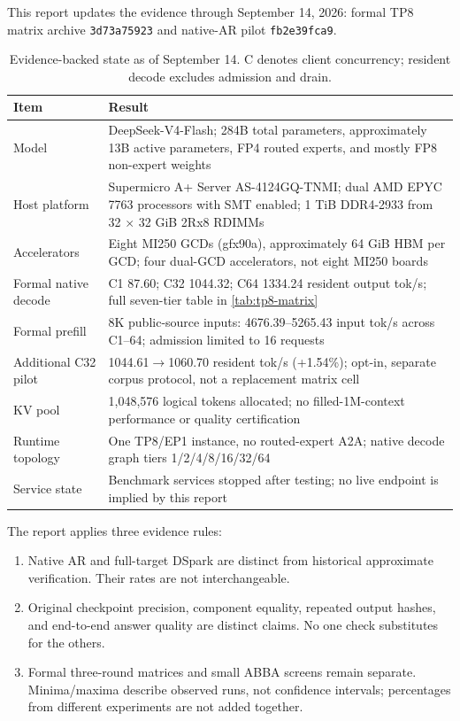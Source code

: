\documentclass[sigplan,10pt]{acmart}
\newcommand{\commit}[1]{\texttt{#1}}
\begin{document}
This report updates the evidence through September 14, 2026: formal TP8 matrix
archive \commit{3d73a75923} and native-AR pilot \commit{fb2e39fca9}.

\begin{table}[tp]
  \centering
  \caption{Evidence-backed state as of September 14. C denotes client concurrency; resident decode excludes admission and drain.}
  \label{tab:headline}
  \begin{tabularx}{\textwidth}{@{}p{}Y@{}}
    \toprule
    Item & Result \\
    \midrule
    Model & DeepSeek-V4-Flash; 284B total parameters, approximately 13B active parameters, FP4 routed experts, and mostly FP8 non-expert weights \\
    Host platform & Supermicro A+ Server AS-4124GQ-TNMI; dual AMD EPYC 7763 processors with SMT enabled; 1 TiB DDR4-2933 from 32 $\times$ 32 GiB 2Rx8 RDIMMs \\
    Accelerators & Eight MI250 GCDs (gfx90a), approximately 64 GiB HBM per GCD; four dual-GCD accelerators, not eight MI250 boards \\
    Formal native decode & C1 87.60; C32 1044.32; C64 1334.24 resident output tok/s; full seven-tier table in \cref{tab:tp8-matrix} \\
    Formal prefill & 8K public-source inputs: 4676.39--5265.43 input tok/s across C1--64; admission limited to 16 requests \\
    Additional C32 pilot & 1044.61$\rightarrow$1060.70 resident tok/s (+1.54\%); opt-in, separate corpus protocol, not a replacement matrix cell \\
    KV pool & 1,048,576 logical tokens allocated; no filled-1M-context performance or quality certification \\
    Runtime topology & One TP8/EP1 instance, no routed-expert A2A; native decode graph tiers 1/2/4/8/16/32/64 \\
    Service state & Benchmark services stopped after testing; no live endpoint is implied by this report \\
    \bottomrule
  \end{tabularx}
\end{table}

The report applies three evidence rules:

\begin{enumerate}
  \item Native AR and full-target DSpark are distinct from historical approximate verification. Their rates are not interchangeable.
  \item Original checkpoint precision, component equality, repeated output hashes, and end-to-end answer quality are distinct claims. No one check substitutes for the others.
  \item Formal three-round matrices and small ABBA screens remain separate. Minima/maxima describe observed runs, not confidence intervals; percentages from different experiments are not added together.
\end{enumerate}
\end{document}
